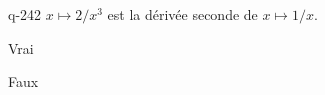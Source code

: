 \begin{truefalse}{q-242}
$x\mapsto 2/x^3$ est la dérivée seconde de $x\mapsto 1/x$.
\item* Vrai
\item Faux
\end{truefalse}

